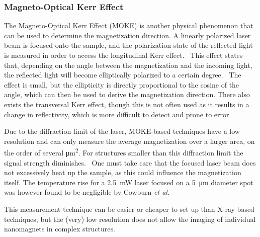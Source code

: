 \documentclass[11pt,a4paper,english]{article}
\begin{document}
\subsubsection{Magneto-Optical Kerr Effect}
The Magneto-Optical Kerr Effect (MOKE) is another physical phenomenon that can be used to determine the magnetization direction. A linearly polarized laser beam is focused onto the sample, and the polarization state of the reflected light is measured in order to access the longitudinal Kerr effect.~\cite{MQCA_RoomTemp} This effect states that, depending on the angle between the magnetization and the incoming light, the reflected light will become elliptically polarized to a certain degree.~\cite{KerrFaraday_book} The effect is small, but the ellipticity is directly proportional to the cosine of the angle, which can then be used to derive the magnetization direction. There also exists the transversal Kerr effect, though this is not often used as it results in a change in reflectivity, which is more difficult to detect and prone to error. \par
Due to the diffraction limit of the laser, MOKE-based techniques have a low resolution and can only measure the average magnetization over a larger area, on the order of several \si{\micro\metre\squared}. For structures smaller than this diffraction limit the signal strength diminishes.~\cite{Probing_MagnetoOptics} One must take care that the focused laser beam does not excessively heat up the sample, as this could influence the magnetization itself. The temperature rise for a \SI{2.5}{\milli\watt} laser focused on a \SI{5}{\micro\metre} diameter spot was however found to be negligible by Cowburn \textit{et al.}~\cite{Probing_MagnetoOptics} \par
This measurement technique can be easier or cheaper to set up than X-ray based techniques, but the (very) low resolution does not allow the imaging of individual nanomagnets in complex structures.

\clearpage
\end{document}
